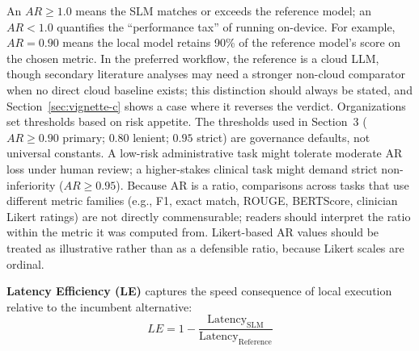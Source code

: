 \documentclass[11pt]{article}
\begin{document}
An $AR \geq 1.0$ means the SLM matches or exceeds the reference model; an $AR < 1.0$ quantifies the ``performance tax'' of running on-device. For example, $AR = 0.90$ means the local model retains 90\% of the reference model's score on the chosen metric. In the preferred workflow, the reference is a cloud LLM, though secondary literature analyses may need a stronger non-cloud comparator when no direct cloud baseline exists; this distinction should always be stated, and Section~\ref{sec:vignette-c} shows a case where it reverses the verdict. Organizations set thresholds based on risk appetite. The thresholds used in Section~3 ($AR \geq 0.90$ primary; $0.80$ lenient; $0.95$ strict) are governance defaults, not universal constants. A low-risk administrative task might tolerate moderate AR loss under human review; a higher-stakes clinical task might demand strict non-inferiority ($AR \geq 0.95$). Because AR is a ratio, comparisons across tasks that use different metric families (e.g., F1, exact match, ROUGE, BERTScore, clinician Likert ratings) are not directly commensurable; readers should interpret the ratio within the metric it was computed from. Likert-based AR values should be treated as illustrative rather than as a defensible ratio, because Likert scales are ordinal.

\textbf{Latency Efficiency (LE)} captures the speed consequence of local execution relative to the incumbent alternative:
\begin{equation}
  LE = 1 - \frac{\text{Latency}_{\text{SLM}}}{\text{Latency}_{\text{Reference}}}
  \label{eq:le}
\end{equation}
\end{document}
